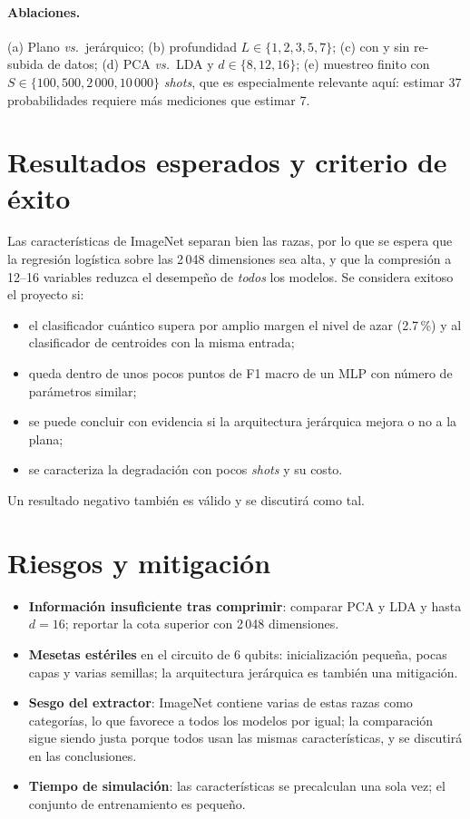 \documentclass[11pt,letterpaper]{article}
\begin{document}
\paragraph{Ablaciones.}
(a) Plano \emph{vs.}\ jerárquico;
(b) profundidad $L\in\{1,2,3,5,7\}$;
(c) con y sin re-subida de datos;
(d) PCA \emph{vs.}\ LDA y $d\in\{8,12,16\}$;
(e) muestreo finito con $S\in\{100,500,2\,000,10\,000\}$ \emph{shots}, que es especialmente relevante
aquí: estimar 37 probabilidades requiere más mediciones que estimar 7.

\section{Resultados esperados y criterio de éxito}
Las características de ImageNet separan bien las razas, por lo que se espera que la regresión
logística sobre las 2\,048 dimensiones sea alta, y que la compresión a 12--16 variables reduzca el
desempeño de \emph{todos} los modelos. Se considera exitoso el proyecto si:
\begin{itemize}[leftmargin=*]
\item el clasificador cuántico supera por amplio margen el nivel de azar (2.7\,\%) y al clasificador de
centroides con la misma entrada;
\item queda dentro de unos pocos puntos de F1 macro de un MLP con número de parámetros similar;
\item se puede concluir con evidencia si la arquitectura jerárquica mejora o no a la plana;
\item se caracteriza la degradación con pocos \emph{shots} y su costo.
\end{itemize}
Un resultado negativo también es válido y se discutirá como tal.

\section{Riesgos y mitigación}
\begin{itemize}[leftmargin=*]
\item \textbf{Información insuficiente tras comprimir}: comparar PCA y LDA y hasta $d=16$; reportar la
cota superior con 2\,048 dimensiones.
\item \textbf{Mesetas estériles} en el circuito de 6 qubits: inicialización pequeña, pocas capas y
varias semillas; la arquitectura jerárquica es también una mitigación.
\item \textbf{Sesgo del extractor}: ImageNet contiene varias de estas razas como categorías, lo que
favorece a todos los modelos por igual; la comparación sigue siendo justa porque todos usan las mismas
características, y se discutirá en las conclusiones.
\item \textbf{Tiempo de simulación}: las características se precalculan una sola vez; el conjunto de
entrenamiento es pequeño.
\end{itemize}
\end{document}
